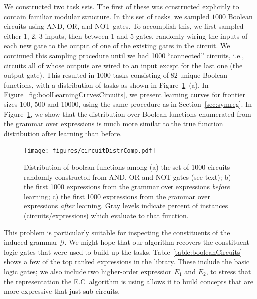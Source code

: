\documentclass{article}
\begin{document}
We constructed two task sets. The first of these was constructed
explicitly to contain familiar modular structure. In this set of
tasks, we sampled $1000$ Boolean circuits using AND, OR, and NOT
gates. To accomplish this, we first sampled either 1, 2, 3 inputs,
then between 1 and 5 gates, randomly wiring the inputs of each new
gate to the output of one of the existing gates in the circuit. We
continued this sampling procedure until we had 1000 ``connected''
circuits, i.e., circuits all of whose outputs are wired to an input
except for the last one (the output gate). This resulted in $1000$
tasks consisting of $82$ unique Boolean functions, with a distribution
of tasks as shown in Figure~\ref{fig:booldistr}~(a). In
Figure~\ref{fig:boolLearningCurvesCircuits}, we present learning
curves for frontier sizes 100, 500 and 10000, using the same procedure
as in Section~\ref{sec:symreg}. In Figure~\ref{fig:booldistr}, we show
that the distribution over Boolean functions enumerated from the
grammar over expressions is much more similar to the true function
distribution after learning than before.

\begin{figure}
\texttt{[image: figures/circuitDistrComp.pdf]}
\caption{Distribution of boolean functions among (a) the set of 1000
  circuits randomly constructed from AND, OR and NOT gates (see text);
  b) the first 1000 expressions from the grammar over expressions
  \emph{before} learning; c) the first 1000 expressions from the
  grammar over expressions \emph{after} learning. Gray levels indicate
  percent of instances (circuits/expressions) which evaluate to that
  function.\label{fig:booldistr}}
\end{figure}

This problem is particularly suitable for inspecting the constituents
of the induced grammar $\mathcal{G}$. We might hope that our algorithm
recovers the constituent logic gates that were used to build up the
tasks. Table~\ref{table:booleanCircuits} shows a few of the top ranked
expressions in the library. These include the basic logic gates; we
also include two higher-order expression $E_1$ and $E_2$, to stress
that the representation the E.C. algorithm is using allows it to build
concepts that are more expressive that just sub-circuits.
\end{document}

